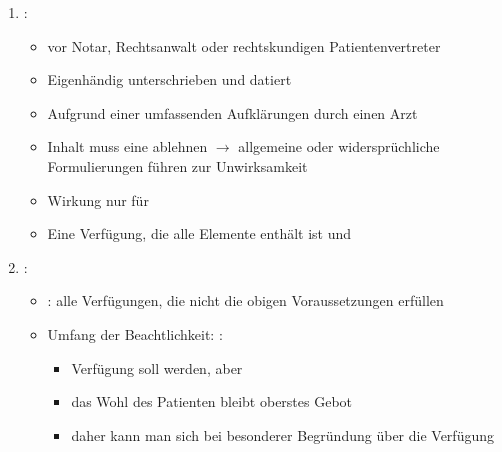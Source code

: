 \begin{enumerate}
  \item {}:
  \begin{itemize}
    \item {} vor Notar, Rechtsanwalt oder
    rechtskundigen Patientenvertreter
    \item Eigenhändig unterschrieben und datiert
    \item Aufgrund einer umfassenden Aufklärungen durch
    einen Arzt
    \item Inhalt muss eine 
    ablehnen ${\rightarrow}$ allgemeine oder
    widersprüchliche Formulierungen führen zur Unwirksamkeit
    \item Wirkung nur für 
    \item Eine Verfügung, die alle Elemente enthält ist
     und 
  \end{itemize}
  \item {}:
  \begin{itemize}
    \item
    : alle Verfügungen, die nicht
    die obigen Voraussetzungen erfüllen
    \item
    Umfang der Beachtlichkeit: :
    \begin{itemize}
      \item
      Verfügung soll  werden, aber
      \item
      das Wohl des Patienten bleibt oberstes Gebot
      \item
      daher kann man sich bei besonderer Begründung über die Verfügung
    \end{itemize}
  \end{itemize}
\end{enumerate}


